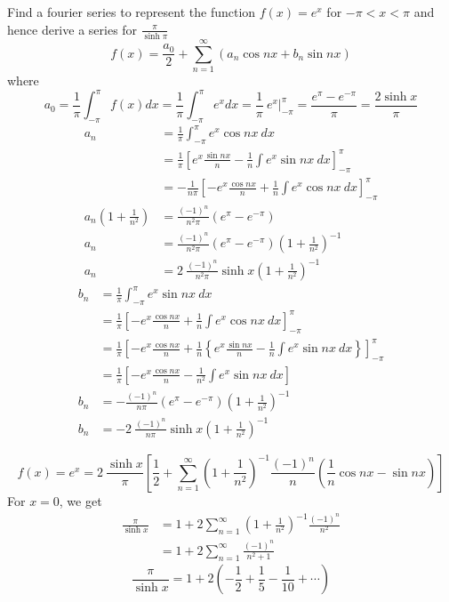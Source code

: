 \documentclass[12pt]{article}
\numberwithin{equation}{subsection}
\begin{document}
\begin{example}{
    Find a fourier series to represent the function $f(x) = e^{x}$ for $-\pi<x<\pi$ and hence derive a series for $\displaystyle \frac{\pi}{\sinh{\pi}}$
}{}
    \[
        f(x) = \frac{a_0}{2} + \sum_{n=1}^{\infty} \left( a_n \cos{nx} + b_n \sin{nx} \right)
    \] where
    \[
        a_0 = \frac{1}{\pi} \int_{-\pi}^{\pi} f(x) dx = \frac{1}{\pi} \int_{-\pi}^{\pi} e^x dx = \frac{1}{\pi} \: e^x \Bigg|_{-\pi}^{\pi} = \frac{e^{\pi} - e^{-\pi}}{\pi} = \frac{2 \sinh{x}}{\pi}
    \]
    \begin{align*}
        a_n &= \frac{1}{\pi} \int_{-\pi}^{\pi} {e^{x} \cos{nx}} \: d{x} \\
        &= \frac{1}{\pi} \left[ e^{x}\frac{\sin{nx}}{n} - \frac{1}{n}\int{e^{x}\sin{nx}} \: d{x} \right]_{-\pi}^{\pi} \\
        &= -\frac{1}{n\pi} \left[ -e^{x}\frac{\cos{nx}}{n} + \frac{1}{n} \int{e^{x}\cos{nx}} \: d{x} \right]_{-\pi}^{\pi} \\
        a_n \left( 1+\frac{1}{n^2} \right) &= \frac{(-1)^n}{n^2\pi} \left( e^{\pi} - e^{-\pi} \right) \\
        a_n &= \frac{(-1)^n}{n^2\pi} \left( e^{\pi} - e^{-\pi} \right) \left( 1+\frac{1}{n^2} \right)^{-1} \\
        a_n &= 2 \: \frac{(-1)^n}{n^2\pi} \sinh{x} \left( 1+\frac{1}{n^2} \right)^{-1}
    \end{align*}
    \begin{align*}
        b_n &= \frac{1}{\pi} \int_{-\pi}^{\pi} {e^{x}\sin{nx}} \: d{x} \\
        &= \frac{1}{\pi} \left[ -e^{x}\frac{\cos{nx}}{n} + \frac{1}{n}\int{e^{x}\cos{nx}} \: d{x} \right]_{-\pi}^{\pi} \\
        &= \frac{1}{\pi} \left[ -e^{x}\frac{\cos{nx}}{n} + \frac{1}{n} \left\{ e^{x}\frac{\sin{nx}}{n} - \frac{1}{n} \int{e^{x}\sin{nx}} \: d{x} \right\} \right]_{-\pi}^{\pi} \\
        &= \frac{1}{\pi} \left[ -e^{x}\frac{\cos{nx}}{n} - \frac{1}{n^2} \int{e^{x}\sin{nx}} \: d{x} \right] \\
        b_n &= - \frac{(-1)^n}{n\pi} \left( e^{\pi} - e^{-\pi} \right) \left( 1+\frac{1}{n^2} \right)^{-1} \\
        b_n &= -2 \: \frac{(-1)^n}{n\pi} \sinh{x} \left( 1+\frac{1}{n^2} \right)^{-1}
    \end{align*}

    \[
        \boxed{ f(x) = e^{x} = 2 \: \frac{\sinh{x}}{\pi} \left[ \frac{1}{2} + \sum_{n=1}^{\infty} \left( 1 + \frac{1}{n^2} \right)^{-1} \frac{(-1)^n}{n} \left( \frac{1}{n}\cos{nx} - \sin{nx} \right) \right] }
    \]
    For $x=0$, we get
    \begin{align*}
        \frac{\pi}{\sinh{x}} &= 1 + 2 \sum_{n=1}^{\infty} \left( 1 + \frac{1}{n^2} \right)^{-1} \frac{(-1)^n}{n^2} \\
        &= 1 + 2 \sum_{n=1}^{\infty} \frac{(-1)^n}{n^2 + 1}
    \end{align*}
    \[
        \boxed{ \frac{\pi}{\sinh{x}} = 1 + 2 \left( -\frac{1}{2} + \frac{1}{5} - \frac{1}{10} + \cdots \right) }
    \]
\end{example}
\end{document}

